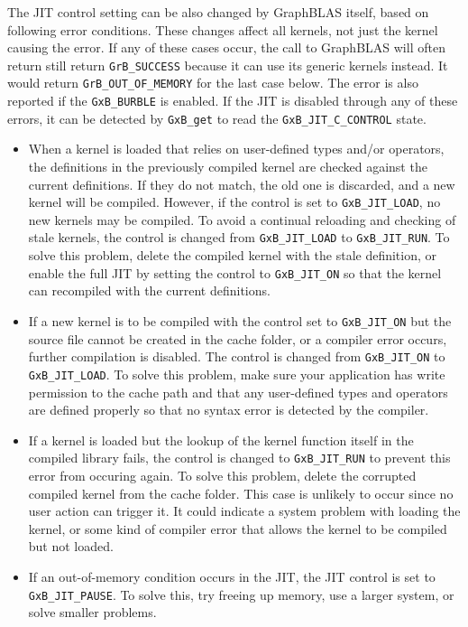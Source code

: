 \documentclass[12pt]{article}
\begin{document}
The JIT control setting can be also changed by GraphBLAS itself, based on
following error conditions.  These changes affect all kernels, not just the
kernel causing the error.  If any of these cases occur, the call to GraphBLAS
will often return still return \verb'GrB_SUCCESS' because it can use its
generic kernels instead.  It would return \verb'GrB_OUT_OF_MEMORY' for the last
case below.  The error is also reported if the \verb'GxB_BURBLE' is enabled.
If the JIT is disabled through any of these errors, it can be detected by
\verb'GxB_get' to read the \verb'GxB_JIT_C_CONTROL' state.

\begin{itemize}

\item When a kernel is loaded that relies on user-defined types and/or
operators, the definitions in the previously compiled kernel are checked
against the current definitions.  If they do not match, the old one is
discarded, and a new kernel will be compiled.  However, if the control is set
to \verb'GxB_JIT_LOAD', no new kernels may be compiled.  To avoid a continual
reloading and checking of stale kernels, the control is changed from
\verb'GxB_JIT_LOAD' to \verb'GxB_JIT_RUN'.  To solve this problem, delete the
compiled kernel with the stale definition, or enable the full JIT by setting
the control to \verb'GxB_JIT_ON' so that the kernel can recompiled with the
current definitions.

\item If a new kernel is to be compiled with the control set to
\verb'GxB_JIT_ON' but the source file cannot be created in the cache folder, or
a compiler error occurs, further compilation is disabled.  The control is
changed from \verb'GxB_JIT_ON' to \verb'GxB_JIT_LOAD'.
To solve this problem, make sure your application has write permission to the
cache path and that any user-defined types and operators are defined properly
so that no syntax error is detected by the compiler.

\item If a kernel is loaded but the lookup of the kernel function itself in the
compiled library fails, the control is changed to \verb'GxB_JIT_RUN' to prevent
this error from occuring again.  To solve this problem, delete the corrupted
compiled kernel from the cache folder.  This case is unlikely to occur since no
user action can trigger it.  It could indicate a system problem with loading
the kernel, or some kind of compiler error that allows the kernel to be
compiled but not loaded.

\item If an out-of-memory condition occurs in the JIT, the JIT control is
set to \verb'GxB_JIT_PAUSE'.  To solve this, try freeing up memory, use a
larger system, or solve smaller problems.

\end{itemize}
\end{document}
